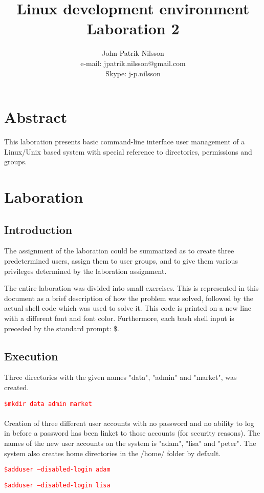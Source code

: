 \documentclass[a4paper,10pt]{article}
\title{Linux development environment \\
	Laboration 2}
\author{John-Patrik Nilsson \\
	e-mail: jpatrik.nilsson@gmail.com \\
	Skype: j-p.nilsson}
\begin{document}
\maketitle

\pagestyle{empty}
\thispagestyle{empty}

\section{Abstract}
This laboration presents basic command-line interface user management of a Linux/Unix based system with special reference to directories, permissions and groups.

\section{Laboration}
\subsection{Introduction}
The assignment of the laboration could be summarized as to create three predetermined users, assign them to user groups, and to give them various privileges determined by the laboration assignment.

The entire laboration was divided into small exercises. This is represented in this document as a brief description of how the problem was solved, followed by the actual shell code which was used to solve it. This code is printed on a new line with a different font and font color. Furthermore, each bash shell input is preceded by the standard prompt: \$.

\subsection{Execution}
Three directories with the given names "data", "admin" and "market", was created. 

\textcolor{red}{\texttt{\$mkdir data admin market}}
\\
\\
Creation of three different user accounts with no password and no ability to log in before a password has been linket to those accounts (for security reasons). The names of the new user accounts on the system is "adam", "lisa" and "peter". The system also creates home directories in the /home/ folder by default.

\textcolor{red}{\texttt{\$adduser --disabled-login adam}}

\textcolor{red}{\texttt{\$adduser --disabled-login lisa}}
\end{document}
